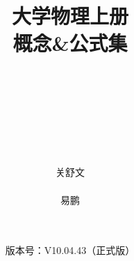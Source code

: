 \documentclass[10pt,a4paper]{book}
\title{{\Huge 大学物理上册}\\[1em]
	概念\&公式集
\vspace{5cm}}
\author{
	\quad\\
	\quad\\
	\quad\\
	\quad\\
	\quad\\
	\quad\\
	\begin{minipage}{0.5\linewidth}
		\centering 
		\color{titlepurple}关舒文\\
		{\color{titlepurple} \CJKfamily{kai}{华南理工大学}}
	\end{minipage}
	\hfill
	\begin{minipage}{0.5\linewidth}
		\centering 
		\color{titlepurple}易鹏\\
		{\color{titlepurple} \CJKfamily{kai}{中山大学}}
	\end{minipage}
\quad \\[1em]}
\date{版本号：V10.04.43（正式版） \\[1em]\color{titlepurple}{2020年7月17日}}
\renewcommand{\textbf}[1]{{\CJKfamily{heiti}#1}}%
\begin{document}
\allowdisplaybreaks%
\maketitle
\thispagestyle{empty}
\cleardoublepage
\thispagestyle{empty}
\restoregeometry
\setcounter{page}{1}
\tableofcontents
\cleardoublepage


\newcommand{\eq}[1][]{\colorbox{eq}{$\displaystyle #1$}}
\newcommand{\dy}[2][]{\vspace*{0.7em} \noindent \tcbox[colframe =Chocolate , colback =Coral,boxrule=0.5mm,size=small,on line]{\color{dya}{\textbf{#1}}}  \index{#2@#1} \hspace*{1em}}
\newcommand{\dya}[1][]{\vspace*{0.7em} \noindent \tcbox[colframe =Chocolate, colback =Coral,boxrule=0.5mm,size=small,on line]{\color{dya}{\textbf{#1}}} \hspace*{1em} }
\newcommand{\n}{\par}
\newcommand{\rd}{\rm{d}}
\newcommand{\disp}{\displaystyle}
\newcommand{\jg}{\vspace*{0.5em}}
\renewcommand{\d}{{\rm{d}}}
\newcommand{\kg}{\hspace*{18pt}}
\newcommand{\tkg}{\quad \quad }
\newcommand{\e}{{\rm{e}}}
























\pagestyle{headings}
\newpage
{}
\appendix
{}
\color{titlepurple}
\printindex
\end{document}
